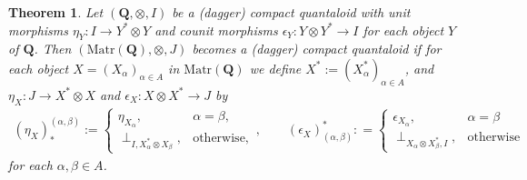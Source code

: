 \documentclass[12pt]{tac}
\newtheorem{theorem}{Theorem}[section]
\theoremstyle{definition}
\theoremstyle{remark}
\newcommand{\<}{\langle}
\renewcommand{\>}{\rangle}
\renewcommand{\:}{\colon}
\begin{document}
\begin{theorem}\label{thm:sum completion dagger compact quantaloid}
    Let $(\mathbf Q,\otimes,I)$ be a (dagger) compact quantaloid with unit morphisms $\eta_Y:I\to Y^*\otimes Y$ and counit morphisms $\epsilon_Y:Y\otimes Y^*\to I$ for each object $Y$ of $\mathbf Q$. Then $(\mathrm{Matr}(\mathbf Q),\otimes,J)$ becomes a (dagger) compact quantaloid if for each object $X=(X_\alpha)_{\alpha\in A}$ in $\mathrm{Matr}(\mathbf Q)$ we define $X^*:=(X_\alpha^*)_{\alpha\in A}$, and $\eta_X:J\to X^*\otimes X$ and $\epsilon_X:X\otimes X^*\to J$ by
   \begin{align*}
   (\eta_X)^{(\alpha,\beta)}_*  :=\begin{cases}
    \eta_{X_\alpha}, & \alpha=\beta,\\
    \perp_{I,X_\alpha^*\otimes X_\beta}, & \mathrm{otherwise},
    \end{cases},\qquad 
     (\epsilon_X)_{(\alpha,\beta)}^* : = \begin{cases}
       \epsilon_{X_\alpha}, & \alpha=\beta\\
       \perp_{X_\alpha\otimes X_\beta^*,I}, & \mathrm{otherwise}
    \end{cases}
    \end{align*}
    for each $\alpha,\beta\in A$.
    
\end{theorem}
\end{document}

